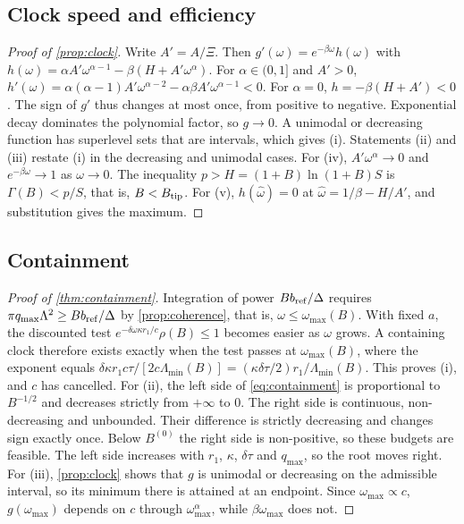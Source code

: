 \documentclass[11pt,a4paper]{article}
\theoremstyle{definition}
\newcommand{\Btip}{B_{\rm tip}}
\newcommand{\Lmin}{\Lambda_{\min}}
\begin{document}
\subsection{Clock speed and efficiency}
\label{app:clock-proof}
\begin{proof}[Proof of \cref{prop:clock}]
Write $A'=A/\Xi$. Then $g'(\omega)=e^{-\beta\omega}h(\omega)$ with
$h(\omega)=\alpha A'\omega^{\alpha-1}-\beta(H+A'\omega^\alpha)$. For
$\alpha\in(0,1]$ and $A'>0$,
$h'(\omega)=\alpha(\alpha-1)A'\omega^{\alpha-2}-\alpha\beta A'\omega^{\alpha-1}<0$.
For $\alpha=0$, $h=-\beta(H+A')<0$. The sign of $g'$ thus changes at most once,
from positive to negative. Exponential decay dominates the polynomial factor,
so $g\to0$. A unimodal or decreasing function has superlevel sets that are
intervals, which gives (i). Statements (ii) and (iii) restate (i) in the
decreasing and unimodal cases. For (iv), $A'\omega^\alpha\to0$ and
$e^{-\beta\omega}\to1$ as $\omega\to0$. The inequality $p>H=(1+B)\ln(1+B)S$ is
$\Gamma(B)<p/S$, that is, $B<\Btip$. For (v), $h(\hat\omega)=0$ at
$\hat\omega=1/\beta-H/A'$, and substitution gives the maximum.
\end{proof}

\subsection{Containment}
\label{app:containment-proof}
\begin{proof}[Proof of \cref{thm:containment}]
Integration of power $Bb_{\rm ref}/\Delta$ requires
$\pi q_{\max}\Lambda^2\geq Bb_{\rm ref}/\Delta$ by \cref{prop:coherence}, that is,
$\omega\leq\omega_{\max}(B)$. With fixed $a$, the discounted test
$e^{-\delta\omega\kappa r_1/c}\rho(B)\leq1$ becomes easier as $\omega$ grows.
A containing clock therefore exists exactly when the test passes at
$\omega_{\max}(B)$, where the exponent equals
$\delta\kappa r_1c\tau/[2c\Lmin(B)]=(\kappa\delta\tau/2)r_1/\Lmin(B)$. This
proves (i), and $c$ has cancelled. For (ii), the left side of
\cref{eq:containment} is proportional to $B^{-1/2}$ and decreases strictly from
$+\infty$ to $0$. The right side is continuous, non-decreasing and unbounded.
Their difference is strictly decreasing and changes sign exactly once. Below
$B^{(0)}$ the right side is non-positive, so these budgets are feasible. The
left side increases with $r_1$, $\kappa$, $\delta\tau$ and $q_{\max}$, so the
root moves right. For (iii), \cref{prop:clock} shows that $g$ is unimodal or
decreasing on the admissible interval, so its minimum there is attained at an
endpoint. Since $\omega_{\max}\propto c$, $g(\omega_{\max})$ depends on $c$
through $\omega_{\max}^\alpha$, while $\beta\omega_{\max}$ does not.
\end{proof}
\end{document}
